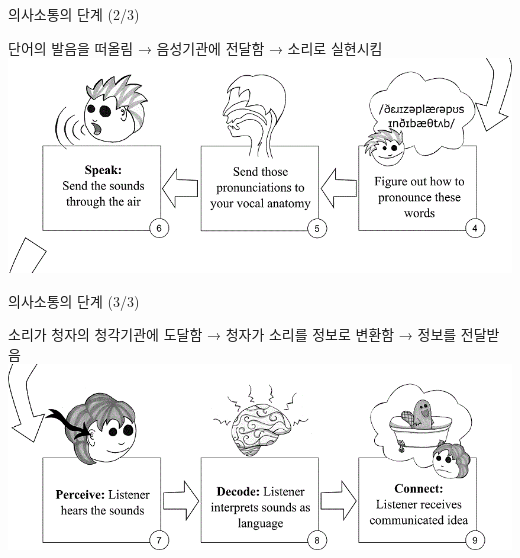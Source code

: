 \documentclass[11pt, aspectratio=169]{beamer}
\begin{document}
\begin{frame}[t]{의사소통의 단계 (2/3)}
  \begin{center}
    단어의 발음을 떠올림 → 음성기관에 전달함 → 소리로 실현시킴
    \vfill
    \includegraphics[width=1.0\textwidth]{img/speech-chain_02.png}
  \end{center}
\end{frame}

\begin{frame}[t]{의사소통의 단계 (3/3)}
  \begin{center}
    소리가 청자의 청각기관에 도달함 → 청자가 소리를 정보로 변환함 → 정보를 전달받음
    \vfill
    \includegraphics[width=1.0\textwidth]{img/speech-chain_03.png}
  \end{center}
\end{frame}
\end{document}
